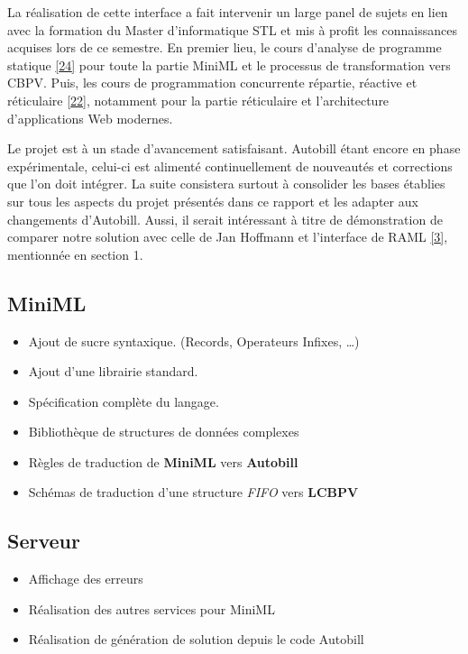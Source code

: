 \documentclass[
  12pt,
]{article}
\providecommand{\tightlist}{%
  \setlength{\itemsep}{0pt}\setlength{\parskip}{0pt}}
\begin{document}
La réalisation de cette interface a fait intervenir un large panel de
sujets en lien avec la formation du Master d'informatique STL et mis à
profit les connaissances acquises lors de ce semestre. En premier lieu,
le cours d'analyse de programme statique
\protect\hyperlink{ref-APS}{{[}24{]}} pour toute la partie MiniML et le
processus de transformation vers CBPV. Puis, les cours de programmation
concurrente répartie, réactive et réticulaire
\protect\hyperlink{ref-PC3R}{{[}22{]}}, notamment pour la partie
réticulaire et l'architecture d'applications Web modernes.

Le projet est à un stade d'avancement satisfaisant. Autobill étant
encore en phase expérimentale, celui-ci est alimenté continuellement de
nouveautés et corrections que l'on doit intégrer. La suite consistera
surtout à consolider les bases établies sur tous les aspects du projet
présentés dans ce rapport et les adapter aux changements d'Autobill.
Aussi, il serait intéressant à titre de démonstration de comparer notre
solution avec celle de Jan Hoffmann et l'interface de RAML
\protect\hyperlink{ref-RAML}{{[}3{]}}, mentionnée en section 1.

\hypertarget{miniml-1}{%
  \subsection{MiniML}\label{miniml-1}}

\begin{itemize}
  \tightlist
  \item
        Ajout de sucre syntaxique. (Records, Operateurs Infixes, \ldots)
  \item
        Ajout d'une librairie standard.
  \item
        Spécification complète du langage.
  \item
        Bibliothèque de structures de données complexes
  \item
        Règles de traduction de \textbf{MiniML} vers \textbf{Autobill}
  \item
        Schémas de traduction d'une structure \emph{FIFO} vers \textbf{LCBPV}
\end{itemize}

\hypertarget{serveur}{%
  \subsection{Serveur}\label{serveur}}

\begin{itemize}
  \tightlist
  \item
        Affichage des erreurs
  \item
        Réalisation des autres services pour MiniML
  \item
        Réalisation de génération de solution depuis le code Autobill
\end{itemize}
\end{document}
